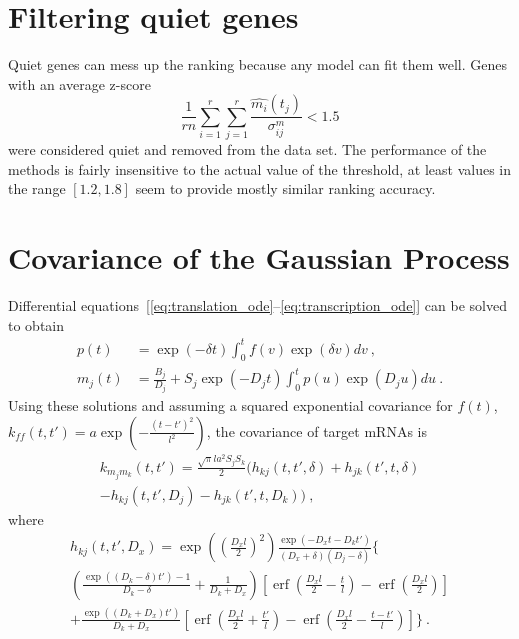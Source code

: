 \documentclass{pnastwo}
\newcommand{\erf}{\operatorname{erf}}
\begin{document}
\begin{article}
\begin{materials}
  \section{Filtering quiet genes}
  Quiet genes can mess up the ranking because any model can fit them
  well. Genes with an average z-score 
  $$ \frac{1}{rn} \sum_{i=1}^r \sum_{j=1}^r \frac{\hat{m_i}(t_j)}{\sigma^m_{ij}} < 1.5 $$
  were considered quiet and removed from the data set.  The
  performance of the methods is fairly insensitive to the actual value
  of the threshold, at least values in the range $[1.2, 1.8]$ seem to
  provide mostly similar ranking accuracy.
  
  \section{Covariance of the Gaussian Process}
  Differential
  equations~[\ref{eq:translation_ode}--\ref{eq:transcription_ode}]
  can be solved to obtain
  \begin{align*}
    p(t) &= \exp(-\delta t) \int_0^t f(v) \exp(\delta v) dv\ , \\
    m_j(t) &= \frac{B_j}{D_j} + S_j \exp(-D_j t) \int_0^t p(u)
    \exp(D_j u) du\ .
  \end{align*}
  Using these solutions and assuming a squared exponential covariance
  for $f(t)$, $k_{ff}(t, t') = a \exp\left( -\frac{(t-t')^2}{l^2}
  \right)$, the covariance of target mRNAs is
  \begin{multline*}
    k_{m_j m_k}(t, t')
    = \frac{\sqrt{\pi} l a^2 S_j S_k}{2} \bigg(
    h_{kj}(t, t', \delta) + h_{jk}(t', t, \delta) \\
    - h_{kj}(t, t', D_j) - h_{jk}(t', t, D_k)
    \bigg)\ ,
  \end{multline*}
  where
  \begin{multline*}
    h_{kj}(t, t', D_x) = 
    \exp\left(\left(\frac{D_x l}{2}\right)^2\right)
    \frac{\exp(-D_x t - D_k t')}{(D_x + \delta) (D_j - \delta)}
    \bigg\{ 
    \\
    \left(\frac{\exp((D_k-\delta) t') - 1}{D_k-\delta} +
      \frac{1}{D_k + D_x} \right)
    [\erf(\frac{D_x l}{2} - \frac{t}{l}) - \erf(\frac{D_x l}{2})]
    \\
    + \frac{\exp((D_k+D_x)t')}{D_k+D_x}
    [\erf(\frac{D_x l}{2} + \frac{t'}{l})
    - \erf(\frac{D_x l}{2} - \frac{t-t'}{l})]
    \bigg\}\ .
  \end{multline*}

\end{materials}
\end{article}
\end{document}
